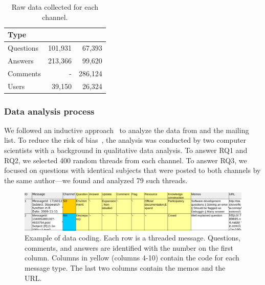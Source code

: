 	\begin{table}[!htb]
	  \centering
      \caption{Raw data collected for each channel.}
      \begin{small}
        \begin{tabular}{lrr}
	        \toprule
	        Type          &  \RH & \SO \\
	        \midrule
	        Questions     & 101,931 &  67,393 \\
	        Answers       & 213,366 &  99,620 \\
	        Comments      &       - & 286,124 \\
	        Users         &  39,150 &  26,324 \\
	        \bottomrule
        \end{tabular}
      \end{small}
	  \label{table:data}
	\end{table}





\subsubsection{Data analysis process}
\label{sec:dap}

We followed an inductive approach~\cite{Runeson2012} to analyze the data from \SO and the \RH mailing list. 
%
To reduce the risk of bias~\cite{Runeson2012}, the analysis was conducted by two computer scientists with a background in qualitative data analysis.
 To answer RQ1 and RQ2, we selected 400 random threads from each channel. To answer RQ3, we focused on questions with identical subjects that were posted to both channels by the same author---we found and analyzed 79 such threads.
    
    \begin{figure}[htbp]
    	\centering
    	\includegraphics[width=.95\textwidth]{Figures/CodingExample}
    	\caption{Example of data coding. Each row is a threaded message. Questions, comments, and answers are identified with the number on the first column. Columns in yellow (columns 4-10) contain the code for each message type. The last two columns contain the memos and the URL.}
    	\label{fig:CodingExample}
    \end{figure}

